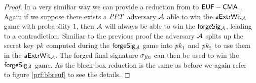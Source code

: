 \begin{proof}
    In a very similiar way we can provide a reduction from \cnstWitnessExtractability to $\mathsf{EUF-CMA\;}$.
    Again if we suppose there exists a $\mathit{PPT}$ adversary $\mathcal{A}$ able to win the $\mathsf{aExtrWit_{\mathcal{A}}}$ game with probability $1$,
    then $\mathcal{A}$ will always be able to win the $\mathsf{forgeSig_{\mathcal{A}}}$, leading to a contradiction. Similiar to the previous proof the adversary $\mathcal{A}$
    splits up the secret key $\mathit{pk}$ computed during the $\mathsf{forgeSig_{\mathcal{A}}}$ game into $\mathit{pk}_1$ and $\mathit{pk}_2$ to use them in the $\mathsf{aExtrWit_{\mathcal{A}}}$.
    The forged final signature $\sigma_{\mathit{fin}}$ can then be used to win the $\mathsf{forgeSig_{\mathcal{A}}}$ game. As the black-box reduction is the same as before we again refer
    to figure \ref{prf:bbreuf} to see the details.

\end{proof}